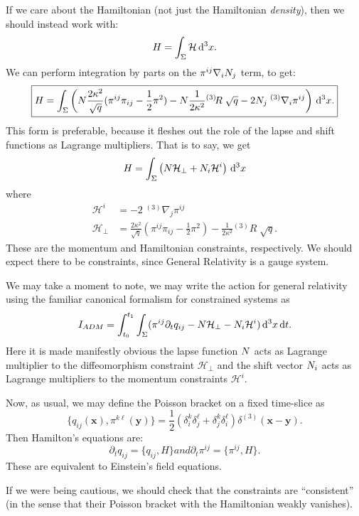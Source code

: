 If we care about the Hamiltonian (not just the Hamiltonian
\emph{density}), then we should instead work with:
\begin{equation}
H = \int_{\Sigma}\mathcal{H}\,\mathrm{d}^{3}x.
\end{equation}
We can perform integration by parts on the $\pi^{ij}\nabla_{i} N_{j}$
term, to get:
\begin{equation}
\boxed{H = \int_{\Sigma}\left(N\frac{2\kappa^{2}}{\sqrt{q}}(\pi^{ij}\pi_{ij}-\frac{1}{2}\pi^{2})
-  N\frac{1}{2\kappa^{2}}{{}^{(3)}\!}R\;\sqrt{q} - 2N_{j}\;{}^{(3)}\nabla_{i}\pi^{ij}
\right)\,\mathrm{d}^{3}x.}
\end{equation}
This form is preferable, because it fleshes out the role of the lapse
and shift functions as Lagrange multipliers. That is to say, we get
\begin{equation}
  H = \int_{\Sigma}\left(N\mathcal{H}_{\perp} + N_{i}\mathcal{H}^{i}\right)\,\mathrm{d}^{3}x
\end{equation}
where
\begin{subequations}
  \begin{align}
    \mathcal{H}^{i} &= -2\;{}^{(3)}\nabla_{j}\pi^{ij}\\
    \mathcal{H}_{\perp} &= \frac{2\kappa^{2}}{\sqrt{q}}(\pi^{ij}\pi_{ij}-\frac{1}{2}\pi^{2})
- \frac{1}{2\kappa^{2}}{{}^{(3)}\!}R\; \sqrt{q}.
  \end{align}
\end{subequations}
These are the momentum and Hamiltonian constraints, respectively. We
should expect there to be constraints, since General Relativity is a
gauge system.

We may take a moment to note, we may write the action for general
relativity using the familiar canonical formalism for constrained
systems as
\begin{equation}
I_{ADM} = \int^{t_{1}}_{t_{0}}\int_{\Sigma}(\pi^{ij}\partial_{t}q_{ij} - N\mathcal{H}_{\perp}
- N_{i}\mathcal{H}^{i})\,\mathrm{d}^{3}x\,\mathrm{d} t.
\end{equation}
Here it is made manifestly obvious the lapse function $N$ acts as
Lagrange multiplier to the diffeomorphism constraint $\mathcal{H}_{\perp}$
and the shift vector $N_{i}$ acts as Lagrange multipliers to the
momentum constraints $\mathcal{H}^{i}$.

Now, as usual, we may define the Poisson bracket on a fixed time-slice
as
\begin{equation}
\{q_{ij}(\mathbf{x}), \pi^{k\ell}(\mathbf{y})\} = \frac{1}{2}(\delta^{k}_{i}\delta^{\ell}_{j}+\delta^{k}_{j}\delta^{\ell}_{i})\delta^{(3)}(\mathbf{x}-\mathbf{y}).
\end{equation}
Then Hamilton's equations are:
\begin{subequations}
  \begin{equation}
\partial_{t}q_{ij} = \{q_{ij},H\}
  \end{equation}
  and
  \begin{equation}
\partial_{t}\pi^{ij} = \{\pi^{ij},H\}.
  \end{equation}
\end{subequations}
These are equivalent to Einstein's field equations.

If we were being cautious, we should check that the constraints are
``consistent'' (in the sense that their Poisson bracket with the
Hamiltonian weakly vanishes).